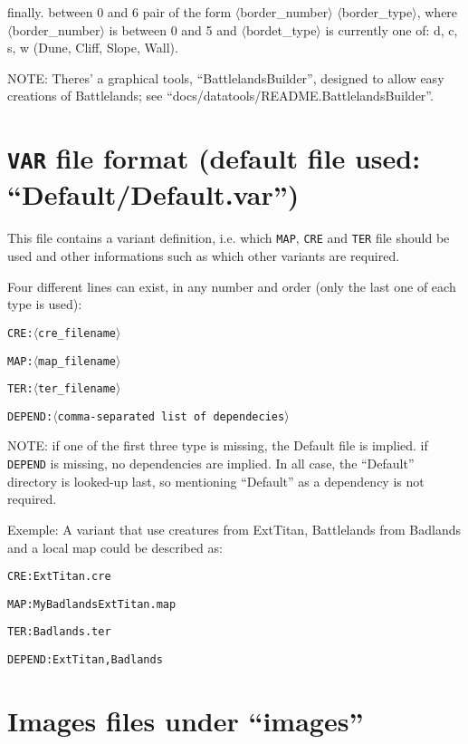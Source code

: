 \documentclass{article}
\begin{document}
finally. between 0 and 6 pair of the form $\langle$border\_number$\rangle$ $\langle$border\_type$\rangle$, where $\langle$border\_number$\rangle$ is between 0 and 5 and $\langle$bordet\_type$\rangle$ is currently one of: d, c, s, w (Dune, Cliff, Slope, Wall).

NOTE: Theres' a graphical tools, ``BattlelandsBuilder'', designed to allow easy creations of Battlelands; see ``docs/datatools/README.BattlelandsBuilder''.

\section{\texttt{VAR} file format (default file used: ``Default/Default.var'')}

This file contains a variant definition, i.e. which
\texttt{MAP}, \texttt{CRE} and \texttt{TER} file should be used and other informations such as which other variants are required.

Four different lines can exist, in any number and order (only the last one of each type is used):

\texttt{\texttt{CRE}:$\langle$cre\_filename$\rangle$}

\texttt{\texttt{MAP}:$\langle$map\_filename$\rangle$}

\texttt{\texttt{TER}:$\langle$ter\_filename$\rangle$}

\texttt{\texttt{DEPEND}:$\langle$comma-separated list of dependecies$\rangle$}

NOTE: if one of the  first three type is missing, the Default file is implied. if \texttt{DEPEND} is missing, no dependencies are implied. In all case, the ``Default'' directory is looked-up last, so mentioning ``Default'' as a dependency is not required.

Exemple: A variant that use creatures from ExtTitan, Battlelands from Badlands and a local map could be described as:

\texttt{\texttt{CRE}:ExtTitan.cre}

\texttt{\texttt{MAP}:MyBadlandsExtTitan.map}

\texttt{\texttt{TER}:Badlands.ter}

\texttt{\texttt{DEPEND}:ExtTitan,Badlands}

\section{Images files under ``images''}
\label{images}
\end{document}
